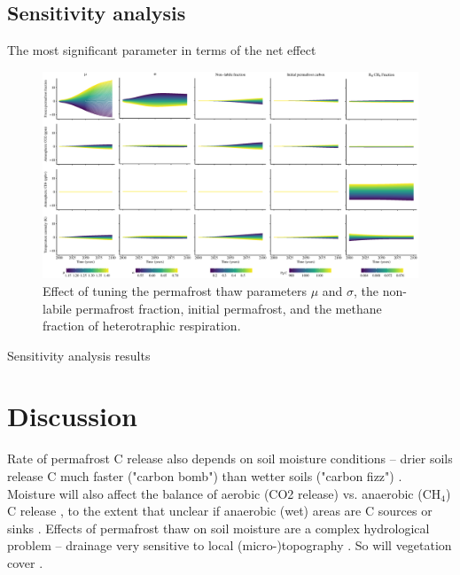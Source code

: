 \documentclass[essd, manuscript]{copernicus}
\begin{document}
\subsection{Sensitivity analysis}

The most significant parameter in terms of the net effect 

\begin{figure}
    \centering
    \includegraphics[width=\textwidth]{figures/sensitivity_analysis_all_years.eps}
    \caption{Effect of tuning the permafrost thaw parameters $\mu$ and $\sigma$, the non-labile permafrost fraction, initial permafrost, and the methane fraction of heterotraphic respiration.}
    \label{fig:sensitivity}
\end{figure}


\begin{table}
\caption{Sensitivity analysis results}

\label{table:sensitivity}
\end{table}

\section{Discussion}
Rate of permafrost C release also depends on soil moisture conditions -- drier soils release C much faster ("carbon bomb") than wetter soils ("carbon fizz") \citep{elberling_2013_long-term}.
Moisture will also affect the balance of aerobic (CO2 release) vs. anaerobic (CH$_4$) C release \citep{turetsky_2002_boreal}, to the extent that unclear if anaerobic (wet) areas are C sources or sinks \citep{wickland_2006_effects}.
Effects of permafrost thaw on soil moisture are a complex hydrological problem -- drainage very sensitive to local (micro-)topography \citep{wickland_2006_effects}.
So will vegetation cover \citep{wickland_2006_effects}.
\end{document}
